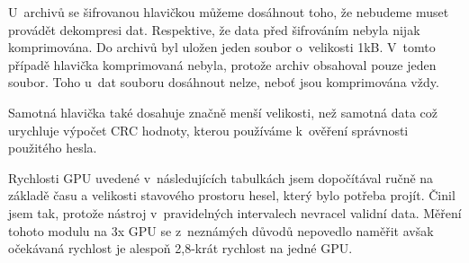 U~archivů se šifrovanou hlavičkou můžeme dosáhnout toho, že nebudeme muset provádět dekompresi
dat. Respektive, že data před šifrováním nebyla nijak komprimována. Do archivů byl uložen
jeden soubor o~velikosti 1kB. V~tomto případě hlavička komprimovaná nebyla, protože archiv
obsahoval pouze jeden soubor. Toho u~dat souboru dosáhnout nelze, neboť jsou komprimována vždy.

Samotná hlavička také dosahuje značně menší velikosti, než samotná data což urychluje výpočet CRC
hodnoty, kterou používáme k~ověření správnosti použitého hesla.

Rychlosti GPU uvedené v~následujících tabulkách jsem dopočítával ručně na základě času a
velikosti stavového prostoru hesel, který bylo potřeba projít. Činil jsem tak, protože nástroj
v~pravidelných intervalech nevracel validní data. Měření tohoto modulu na 3x GPU se z~neznámých
důvodů nepovedlo naměřit avšak očekávaná rychlost je alespoň 2,8-krát rychlost na jedné GPU.

